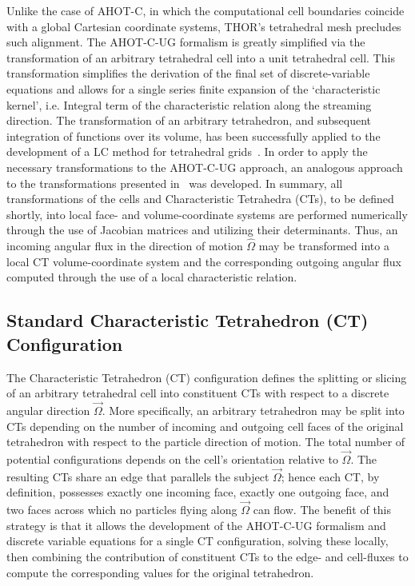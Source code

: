 Unlike the case of \ac{AHOT-C}, in which the computational cell boundaries coincide with a global Cartesian coordinate systems, \ac{THOR}'s tetrahedral mesh precludes such alignment.
The \ac{AHOT-C-UG} formalism is greatly simplified via the transformation of an arbitrary tetrahedral cell into a unit tetrahedral cell.
This transformation simplifies the derivation of the final set of discrete-variable equations and allows for a single series finite expansion of the ‘characteristic kernel’, i.e.
Integral term of the characteristic relation along the streaming direction.
The transformation of an arbitrary tetrahedron, and subsequent integration of functions over its volume, has been successfully applied to the development of a \ac{LC} method for tetrahedral grids~\cite{Mathews2000}.
In order to apply the necessary transformations to the \ac{AHOT-C-UG} approach, an analogous approach to the transformations presented in~\cite{Mathews2000} was developed.
In summary, all transformations of the cells and Characteristic Tetrahedra (CTs), to be defined shortly, into local face- and volume-coordinate systems are performed numerically through the use of Jacobian matrices and utilizing their determinants.
Thus, an incoming angular flux in the direction of motion $\hat{\Omega}$ may be transformed into a local CT volume-coordinate system and the corresponding outgoing angular flux computed through the use of a local characteristic relation.


\subsection{Standard Characteristic Tetrahedron (CT) Configuration}

The Characteristic Tetrahedron (CT) configuration defines the splitting or slicing of an arbitrary tetrahedral cell into constituent CTs with respect to a discrete angular direction $\vec{\Omega}$.
More specifically, an arbitrary tetrahedron may be split into CTs depending on the number of incoming and outgoing cell faces of the original tetrahedron with respect to the particle direction of motion.
The total number of potential configurations depends on the cell's orientation relative to $\vec{\Omega}$.
The resulting CTs share an edge that parallels the subject $\vec{\Omega}$; hence each CT, by definition, possesses exactly one incoming face, exactly one outgoing face, and two faces across which no particles flying along $\vec{\Omega}$ can flow.
The benefit of this strategy is that it allows the development of the \ac{AHOT-C-UG} formalism and discrete variable equations for a single CT configuration, solving these locally, then combining the contribution of constituent CTs to the edge- and cell-fluxes to compute the corresponding values for the original tetrahedron.

